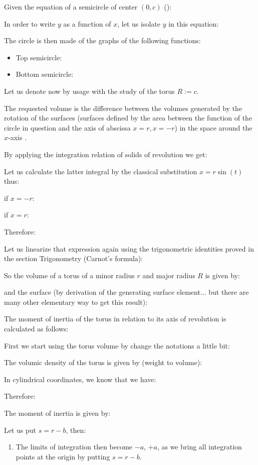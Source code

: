 {	Given the equation of a semicircle of center $(0, c)$ ():
	
	In order to write $y$ as a function of $x$, let us isolate $y$ in this equation:
	
	The circle is then made of the graphs of the following functions:
	\begin{itemize} 
		\item Top semicircle:
		

		\item Bottom semicircle:
		
	\end{itemize}
	Let us denote now by usage with the study of the torus $R:=c$.
	
	The requested volume is the difference between the volumes generated by the rotation of the surfaces (surfaces defined by the area between the function of the circle in question and the axis of abscissa $x=r,x=-r$) in the space around the $x$-axis .

	By applying the integration relation of solids of revolution we get:
	
	Let us calculate the latter integral by the classical substitution $x=r\sin(t)$  thus:
	
	if $x=-r$:
	
	if $x=r$:
	
	Therefore:
	
	Let us linearize that expression again using the trigonometric identities proved in the section Trigonometry (Carnot's formula):
	
	So the volume of a torus of a minor radius $r$ and major radius $R$ is given by:
	
	and the surface (by derivation of the generating surface element... but there are many other elementary way to get this result):
	
	The moment of inertia of the torus in relation to its axis of revolution is calculated as follows:

	First we start using the torus volume by change the notations a little bit:
	
	The volumic density of the torus is given by (weight to volume):
	
	In cylindrical coordinates, we know that we have:
	
	Therefore:
	
	The moment of inertia is given by:
	
	Let us put $s=r-b$, then:
	\begin{enumerate}
		\item The limits of integration then become $-a$, $+ a$, as we bring all integration points at the origin by putting $s=r-b$.


\end{enumerate}}
